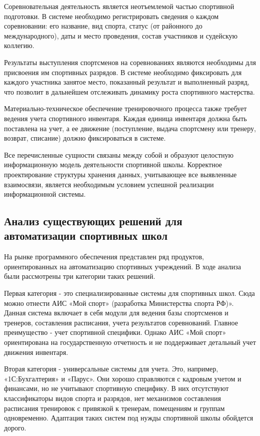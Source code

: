 Соревновательная деятельность является неотъемлемой частью спортивной подготовки. В системе необходимо регистрировать сведения о каждом соревновании: его название, вид спорта, статус (от районного до международного), даты и место проведения, состав участников и судейскую коллегию.

Результаты выступления спортсменов на соревнованиях являются необходимы для присвоения им спортивных разрядов. В системе необходимо фиксировать для каждого участника занятое место, показанный результат и выполненный разряд, что позволит в дальнейшем отслеживать динамику роста спортивного мастерства.

Материально-техническое обеспечение тренировочного процесса также требует ведения учета спортивного инвентаря. Каждая единица инвентаря должна быть поставлена на учет, а ее движение (поступление, выдача спортсмену или тренеру, возврат, списание) должно фиксироваться в системе.

Все перечисленные сущности связаны между собой и образуют целостную информационную модель деятельности спортивной школы. Корректное проектирование структуры хранения данных, учитывающее все выявленные взаимосвязи, является необходимым условием успешной реализации информационной системы.

\subsection{Анализ существующих решений для автоматизации спортивных школ}

На рынке программного обеспечения представлен ряд продуктов, ориентированных на автоматизацию спортивных учреждений. В ходе анализа были рассмотрены три категории таких решений.

Первая категория - это специализированные системы для спортивных школ. Сюда можно отнести АИС «Мой спорт» (разработка Министерства спорта РФ)». Данная система включает в себя модули для ведения базы спортсменов и тренеров, составления расписания, учета результатов соревнований. Главное преимущество - учет спортивной специфики. Однако АИС «Мой спорт» ориентирована на государственную отчетность и не поддерживает детальный учет движения инвентаря.

Вторая категория - универсальные системы для учета. Это, например, «1С:Бухгалтерия» и «Парус». Они хорошо справляются с кадровым учетом и финансами, но не учитывают спортивную специфику. В них отсутствуют классификаторы видов спорта и разрядов, нет механизмов составления расписания тренировок с привязкой к тренерам, помещениям и группам одновременно. Адаптация таких систем под нужды спортивной школы обойдется дорого.

